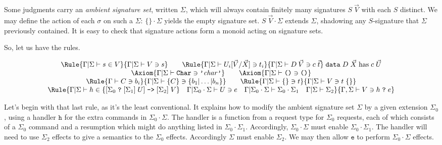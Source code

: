 \documentclass{article}
\begin{document}
Some judgments carry an \emph{ambient signature set}, written
\(\Sigma\), which will always contain finitely many signatures
\(S\;\vec{V}\) with each \(S\) distinct. We may define the action
of each \(\sigma\) on such a \(\Sigma\): \(\{\}\cdot\Sigma\)
yields the empty signature set. \(S\;\vec{V}\cdot\Sigma\)
extends \(\Sigma\), shadowing any \(S\)-signature that \(\Sigma\)
previously contained. It is easy to check that signature actions
form a monoid acting on signature sets.

So, let us have the rules.

\[\begin{array}{c}
\Rule{\Gamma|\Sigma \vdash s \in V}
    {\Gamma|\Sigma \vdash V \ni s} \qquad
\Rule{\Gamma|\Sigma \vdash U_i[\vec{V}/\vec{X}]\ni t_i}
  {\Gamma|\Sigma \vdash D\:\vec{V} \ni c\;\vec{t}}\; {\texttt{data}\;D\;\vec{X}\;\mbox{has}\; c\;\vec{U}}
\\
\Axiom{\Gamma|\Sigma \vdash \texttt{Char} \ni \texttt{'}\mathit{char}\texttt{'} } \qquad
\Axiom{\Gamma|\Sigma \vdash \texttt{()} \ni \texttt{()}  }\\
\Rule{\Gamma\vdash C \ni b_i}
  {\Gamma|\Sigma\vdash\{C\}\ni\{b_1|\ldots|b_n\}}\qquad
\Rule{\Gamma|\Sigma\vdash\{\} \ni t}
  {\Gamma|\Sigma\vdash V\ni t\;\{\}} \\
\Rule{\Gamma|\Sigma\vdash h\in\{[\Sigma_0\;\texttt{?}\;[\Sigma_1]\;U] \;\texttt{->}\; [\Sigma_2]\;V\} \quad
  \Gamma|\Sigma_0\cdot\Sigma\vdash U\ni e\quad
  \Gamma|\Sigma_0\cdot\Sigma\vdash \Sigma_0\cdot\Sigma_1\quad
  \Gamma|\Sigma\vdash\Sigma_2}
  {\Gamma,\Sigma\vdash V\ni h\;\texttt{?}\;e}
\end{array}\]

Let's begin with that last rule, as it's the least conventional. It
explains how to modify the ambient signature set \(\Sigma\) by a given
extension \(\Sigma_0\), using a handler \(\texttt{h}\) for the extra
commands in \(\Sigma_0\cdot\Sigma\). The handler is a function from a
request type for \(\Sigma_0\) requests, each of which consists of a
\(\Sigma_0\) command and a resumption which might do anything listed
in \(\Sigma_0\cdot\Sigma_1\). Accordingly, \(\Sigma_0\cdot\Sigma\)
must enable \(\Sigma_0\cdot\Sigma_1\).  The handler will need to use
\(\Sigma_2\) effects to give a semantics to the \(\Sigma_0\) effects.
Accordingly \(\Sigma\) must enable \(\Sigma_2\). We may then allow
\(\texttt{e}\) to perform \(\Sigma_0\cdot\Sigma\) effects.
\end{document}
